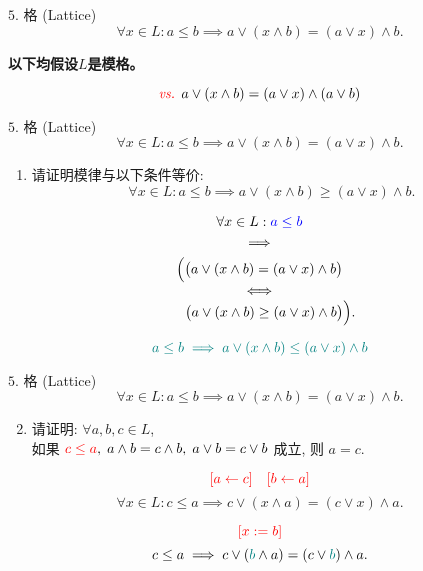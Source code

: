 \begin{frame}{}
  \begin{exampleblock}{$5.$ 格 (Lattice)}
    \[
      \forall x \in L: a \le b \implies a \lor (x \land b) = (a \lor x) \land b.
    \]

    \textbf{以下均假设$L$是模格。}
  \end{exampleblock}

  \pause

  \pause
  \[
    \textcolor{red}{\emph{vs. }} a \lor (x \land b) = (a \lor x) \land (a \lor b)
  \]
\end{frame}

\begin{frame}{}
  \begin{exampleblock}{$5.$ 格 (Lattice)}
    \[
      \forall x \in L: a \le b \implies a \lor (x \land b) = (a \lor x) \land b.
    \]

    \begin{enumerate}[(1)]
      \item 请证明模律与以下条件等价:
	\[
	  \forall x \in L: a \le b \implies a \lor (x \land b) \ge (a \lor x) \land b.
	\]
    \end{enumerate}
  \end{exampleblock}

  \pause
  \begin{gather*}
    \forall x \in L: \textcolor{blue}{a \le b} \\
    \implies \\
    \Big(\big(a \lor (x \land b) = (a \lor x) \land b\big) \\[-0.8ex]
    \iff \\[-0.8ex]
    \quad\;\;\big(a \lor (x \land b) \ge (a \lor x) \land b\big)\Big).
  \end{gather*}

  \pause
  \[
    \textcolor{teal}{a \le b \implies a \lor (x \land b) \le (a \lor x) \land b}
  \]
\end{frame}

\begin{frame}{}
  \begin{exampleblock}{$5.$ 格 (Lattice)}
    \[
      \forall x \in L: a \le b \implies a \lor (x \land b) = (a \lor x) \land b.
    \]

    \begin{enumerate}[(1)]
      \setcounter{enumi}{1}
    \item 请证明: $\forall a, b, c \in L$, \\
      如果 $\textcolor{red}{c \le a}, \; a \land b = c \land b, \; a \lor b = c \lor b$ 成立, 则 $a = c$.
    \end{enumerate}
  \end{exampleblock}

  \pause
  \[
    \textcolor{red}{[a \leftarrow c] \quad [b \leftarrow a]}
  \]
  \[
    \forall x \in L: c \le a \implies c \lor (x \land a) = (c \lor x) \land a.
  \]

  \pause
  \[
    \textcolor{red}{[x := b]}
  \]
  \[
    c \le a \implies c \lor (\textcolor{teal}{b} \land a) = (c \lor \textcolor{teal}{b}) \land a.
  \]
\end{frame}

